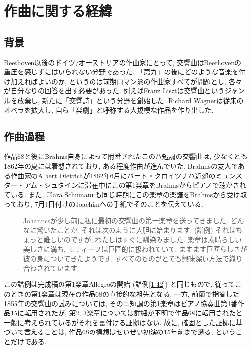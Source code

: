 
\chapter{作曲に関する経緯}

\section{背景}\label{sec: background}

Beethoven以後のドイツ/オーストリアの作曲家にとって, 交響曲はBeethovenの重圧を感じずにはいられない分野であった.
「第九」の後にどのような音楽を付け加えればよいのか, というのは前期ロマン派の作曲家すべてが問題とし, 各々が自分なりの回答を出す必要があった.
例えばFranz Lisztは交響曲というジャンルを放棄し, 新たに「交響詩」という分野を創始した.
Richard Wagnerは従来のオペラを拡大し, 自ら「楽劇」と呼称する大規模な作品を作り出した.





\section{作曲過程}\label{sec: process}

作品68と後にBrahms自身によって附番されたこのハ短調の交響曲は, 少なくとも1862年の夏には着想されており, ある程度作曲が進んでいた.
Brahmsの友人である作曲家のAlbert Dietrichが1862年6月にバート・クロイツナハ近郊のミュンスター・アム・シュタインに滞在中にこの第1楽章をBrahmsからピアノで聴かされている\cite{kaisouroku}.
また, Clara Schumannも同じ時期にこの楽章の楽譜をBrahmsから受け取っており, 7月1日付けのJoachimへの手紙でそのことを伝えている.
\begin{quote}
	Johannesが少し前に私に最初の交響曲の第一楽章を送ってきました. どんなに驚いたことか. それは次のように大胆に始まります.
	(譜例) %
	それはちょっと難しいのですが, わたしはすぐに馴染みました.
	楽章は素晴らしい美しさに満ち, モティーフは巨匠的に扱われていて, ますます巨匠らしさが彼の身についてきたようです.
	すべてのものがとても興味深い方法で織り合わされています.\cite{compos}
\end{quote}
この譜例は完成稿の第1楽章Allegroの開始 (譜例\ref{1-42}) と同じもので, 従ってこのときの第1楽章は現在の作品68の直接的な祖先となる.
一方, 前節で指摘した1855年の交響曲の試みについては, そのニ短調の第1楽章はピアノ協奏曲第1番作品15に転用されたが,
第2, 3楽章については詳細が不明で作品68に転用されたと一般に考えられているがそれを裏付ける証拠はない.
故に, 確固とした証拠に基づいて言えることは, 作品68の構想はせいぜい初演の15年前まで遡る, ということだけである.

